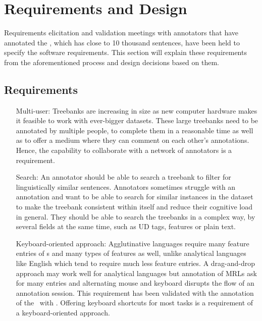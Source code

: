\section{Requirements and Design}
\label{sec:requirements}

Requirements elicitation and validation meetings with annotators that have annotated the \bountreebank, which has close to 10 thousand sentences, have been held to specify the software requirements.
This section will explain these requirements from the aforementioned process and design decisions based on them.

\subsection{Requirements}
\begin{itemize}[before=\normalfont, font=\itshape, align=left]
    \item[Multi-user:]
        Treebanks are increasing in size as new computer hardware makes it feasible to work with ever-bigger datasets.
        These large treebanks need to be annotated by multiple people, to complete them in a reasonable time as well as to offer a medium where they can comment on each other's annotations.
        Hence, the capability to collaborate with a network of annotators is a requirement.

    \item[Search:]
        An annotator should be able to search a treebank to filter for linguistically similar sentences.
        Annotators sometimes struggle with an annotation and want to be able to search for similar instances in the dataset to make the treebank consistent within itself and reduce their cognitive load in general.
        They should be able to search the treebanks in a complex way, by several fields at the same time, such as UD tags, features or plain text.

    \item[Keyboard-oriented approach:]
        Agglutinative languages require many feature entries of \form s and many types of features as well, unlike analytical languages like English which tend to require much less feature entries.
        A drag-and-drop approach may work well for analytical languages but annotation of MRLs ask for many entries and alternating mouse and keyboard disrupts the flow of an annotation session.
        This requirement has been validated with the annotation of the \bountreebank\ with \boatvone.
        Offering keyboard shortcuts for most tasks is a requirement of a keyboard-oriented approach.


\end{itemize}
